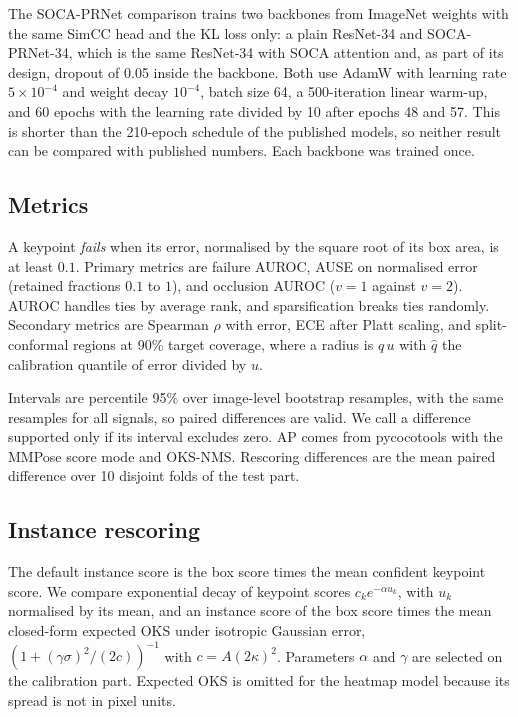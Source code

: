 \documentclass[preprint,11pt]{elsarticle}
\begin{document}
The SOCA-PRNet comparison trains two backbones from ImageNet weights with the same SimCC head and the
KL loss only: a plain ResNet-34 and SOCA-PRNet-34, which is the same ResNet-34 with SOCA attention and,
as part of its design, dropout of 0.05 inside the backbone. Both use AdamW with learning rate
$5\times10^{-4}$ and weight decay $10^{-4}$, batch size 64, a 500-iteration linear warm-up, and 60 epochs
with the learning rate divided by 10 after epochs 48 and 57. This is shorter than the 210-epoch schedule
of the published models, so neither result can be compared with published numbers. Each backbone was
trained once.

\subsection{Metrics}

A keypoint \emph{fails} when its error, normalised by the square root of its box area, is at
least $0.1$. Primary metrics are failure AUROC, AUSE on normalised error (retained fractions
$0.1$ to $1$), and occlusion AUROC ($v{=}1$ against $v{=}2$). AUROC handles ties by average rank,
and sparsification breaks ties randomly. Secondary metrics are Spearman $\rho$ with error, ECE
after Platt scaling, and split-conformal regions at 90\% target coverage, where a radius is
$\hat q\, u$ with $\hat q$ the calibration quantile of error divided by $u$.

Intervals are percentile 95\% over \numBoot{} image-level bootstrap resamples, with the same
resamples for all signals, so paired differences are valid. We call a difference supported only
if its interval excludes zero. AP comes from pycocotools with the MMPose score mode and OKS-NMS.
Rescoring differences are the mean paired difference over 10 disjoint folds of the test part.

\subsection{Instance rescoring}

The default instance score is the box score times the mean confident keypoint score. We compare
exponential decay of keypoint scores $c_k e^{-\alpha u_k}$, with $u_k$ normalised by its mean, and
an instance score of the box score times the mean closed-form expected OKS under isotropic Gaussian
error, $(1+(\gamma\sigma)^2/(2c))^{-1}$ with $c=A(2\kappa)^2$. Parameters $\alpha$ and $\gamma$ are
selected on the calibration part. Expected OKS is omitted for the heatmap model because its spread
is not in pixel units.
\end{document}
